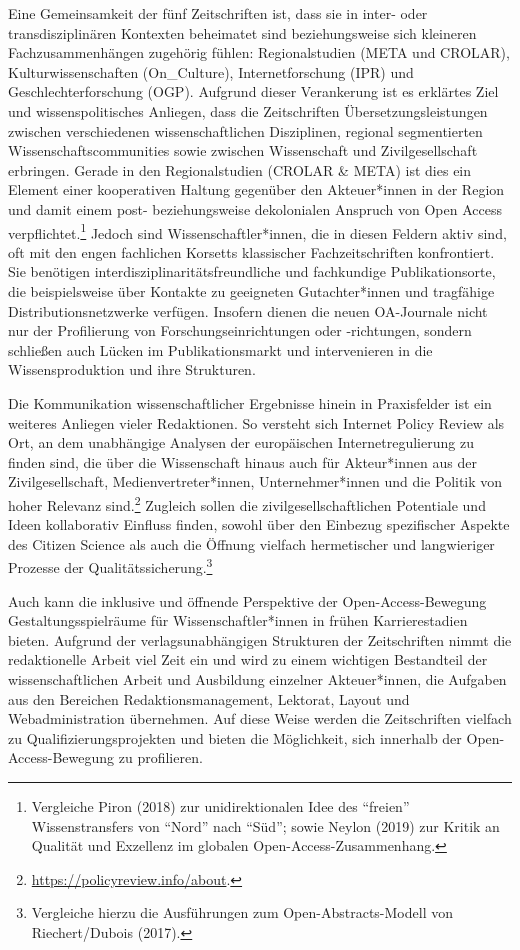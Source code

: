 \documentclass[a4paper,
fontsize=11pt,
oneside,
numbers=noperiodatend,
parskip=half-,
bibliography=totoc,
final
]{scrartcl}
\begin{document}
Eine Gemeinsamkeit der fünf Zeitschriften ist, dass sie in inter- oder
transdisziplinären Kontexten beheimatet sind beziehungsweise sich
kleineren Fachzusammenhängen zugehörig fühlen: Regionalstudien (META und
CROLAR), Kulturwissenschaften (On\_Culture), Internetforschung (IPR) und
Geschlechterforschung (OGP). Aufgrund dieser Verankerung ist es
erklärtes Ziel und wissenspolitisches Anliegen, dass die Zeitschriften
Übersetzungsleistungen zwischen verschiedenen wissenschaftlichen
Disziplinen, regional segmentierten Wissenschaftscommunities sowie
zwischen Wissenschaft und Zivilgesellschaft erbringen. Gerade in den
Regionalstudien (CROLAR \& META) ist dies ein Element einer kooperativen
Haltung gegenüber den Akteuer*innen in der Region und damit einem post-
beziehungsweise dekolonialen Anspruch von Open Access
verpflichtet.\footnote{Vergleiche Piron (2018) zur unidirektionalen Idee
  des \enquote{freien} Wissenstransfers von \enquote{Nord} nach
  \enquote{Süd}; sowie Neylon (2019) zur Kritik an Qualität und
  Exzellenz im globalen Open-Access-Zusammenhang.} Jedoch sind
Wissenschaftler*innen, die in diesen Feldern aktiv sind, oft mit den
engen fachlichen Korsetts klassischer Fachzeitschriften konfrontiert.
Sie benötigen interdisziplinaritätsfreundliche und fachkundige
Publikationsorte, die beispielsweise über Kontakte zu geeigneten
Gutachter*innen und tragfähige Distributionsnetzwerke verfügen. Insofern
dienen die neuen OA-Journale nicht nur der Profilierung von
Forschungseinrichtungen oder -richtungen, sondern schließen auch Lücken
im Publikationsmarkt und intervenieren in die Wissensproduktion und ihre
Strukturen.

Die Kommunikation wissenschaftlicher Ergebnisse hinein in Praxisfelder
ist ein weiteres Anliegen vieler Redaktionen. So versteht sich Internet
Policy Review als Ort, an dem unabhängige Analysen der europäischen
Internetregulierung zu finden sind, die über die Wissenschaft hinaus
auch für Akteur*innen aus der Zivilgesellschaft, Medienvertreter*innen,
Unternehmer*innen und die Politik von hoher Relevanz sind.\footnote{\url{https://policyreview.info/about}.}
Zugleich sollen die zivilgesellschaftlichen Potentiale und Ideen
kollaborativ Einfluss finden, sowohl über den Einbezug spezifischer
Aspekte des Citizen Science als auch die Öffnung vielfach hermetischer
und langwieriger Prozesse der Qualitätssicherung.\footnote{Vergleiche
  hierzu die Ausführungen zum Open-Abstracts-Modell von Riechert/Dubois
  (2017).}

Auch kann die inklusive und öffnende Perspektive der
Open-Access-Bewegung Gestaltungsspielräume für Wissenschaftler*innen in
frühen Karrierestadien bieten. Aufgrund der verlagsunabhängigen
Strukturen der Zeitschriften nimmt die redaktionelle Arbeit viel Zeit
ein und wird zu einem wichtigen Bestandteil der wissenschaftlichen
Arbeit und Ausbildung einzelner Akteuer*innen, die Aufgaben aus den
Bereichen Redaktionsmanagement, Lektorat, Layout und Webadministration
übernehmen. Auf diese Weise werden die Zeitschriften vielfach zu
Qualifizierungsprojekten und bieten die Möglichkeit, sich innerhalb der
Open-Access-Bewegung zu profilieren.
\end{document}
